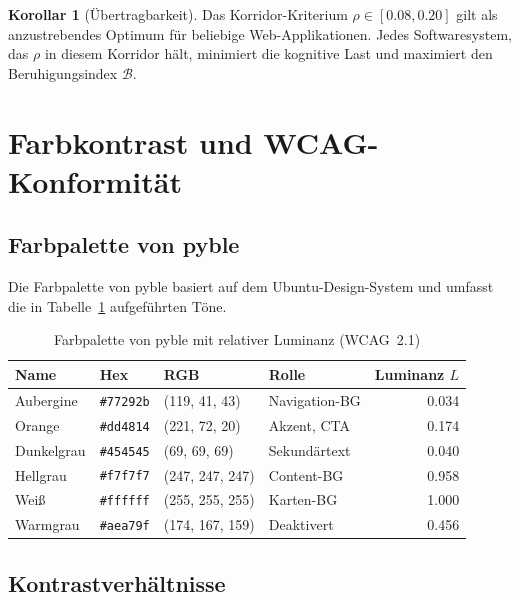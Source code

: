 ﻿\documentclass[a4paper,12pt]{article}
\theoremstyle{definition}
\newtheorem{korollar}{Korollar}
\begin{document}
\begin{korollar}[Übertragbarkeit]
\label{kor:uebertragbarkeit}
    Das Korridor-Kriterium $\rho \in [0.08, 0.20]$ gilt als anzustrebendes
    Optimum für beliebige Web-Applikationen. Jedes Softwaresystem, das $\rho$
    in diesem Korridor hält, minimiert die kognitive Last und maximiert den
    Beruhigungsindex $\mathcal{B}$.
\end{korollar}

\section{Farbkontrast und WCAG-Konformität}
\label{sec:kontrast}

\subsection{Farbpalette von pyble}

Die Farbpalette von pyble basiert auf dem Ubuntu-Design-System und umfasst
die in Tabelle~\ref{tab:farben} aufgeführten Töne.

\begin{table}[h]
\centering
\caption{Farbpalette von pyble mit relativer Luminanz (WCAG~2.1)}
\label{tab:farben}
\begin{tabular}{llllr}
\toprule
\textbf{Name} & \textbf{Hex} & \textbf{RGB} & \textbf{Rolle} & \textbf{Luminanz $L$} \\
\midrule
Aubergine   & \texttt{\#77292b} & (119, 41, 43)   & Navigation-BG    & 0.034 \\
Orange      & \texttt{\#dd4814} & (221, 72, 20)   & Akzent, CTA       & 0.174 \\
Dunkelgrau  & \texttt{\#454545} & (69, 69, 69)    & Sekundärtext      & 0.040 \\
Hellgrau    & \texttt{\#f7f7f7} & (247, 247, 247) & Content-BG       & 0.958 \\
Weiß        & \texttt{\#ffffff} & (255, 255, 255) & Karten-BG        & 1.000 \\
Warmgrau    & \texttt{\#aea79f} & (174, 167, 159) & Deaktivert        & 0.456 \\
\bottomrule
\end{tabular}
\end{table}

\subsection{Kontrastverhältnisse}
\end{document}

